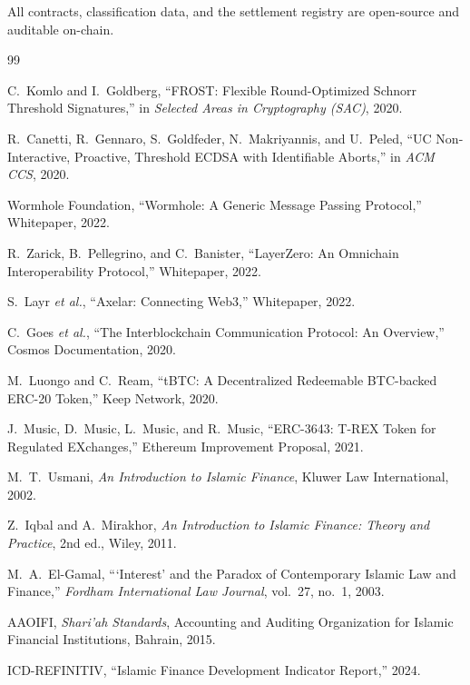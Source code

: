 \documentclass[11pt,twocolumn]{article}
\theoremstyle{definition}
\begin{document}
All contracts, classification data, and the settlement registry are open-source and auditable on-chain.

\begin{thebibliography}{99}

 C.~Komlo and I.~Goldberg, ``FROST: Flexible Round-Optimized Schnorr Threshold Signatures,'' in \emph{Selected Areas in Cryptography (SAC)}, 2020.

 R.~Canetti, R.~Gennaro, S.~Goldfeder, N.~Makriyannis, and U.~Peled, ``UC Non-Interactive, Proactive, Threshold ECDSA with Identifiable Aborts,'' in \emph{ACM CCS}, 2020.

 Wormhole Foundation, ``Wormhole: A Generic Message Passing Protocol,'' Whitepaper, 2022.

 R.~Zarick, B.~Pellegrino, and C.~Banister, ``LayerZero: An Omnichain Interoperability Protocol,'' Whitepaper, 2022.

 S.~Layr \emph{et al.}, ``Axelar: Connecting Web3,'' Whitepaper, 2022.

 C.~Goes \emph{et al.}, ``The Interblockchain Communication Protocol: An Overview,'' Cosmos Documentation, 2020.

 M.~Luongo and C.~Ream, ``tBTC: A Decentralized Redeemable BTC-backed ERC-20 Token,'' Keep Network, 2020.

 J.~Music, D.~Music, L.~Music, and R.~Music, ``ERC-3643: T-REX Token for Regulated EXchanges,'' Ethereum Improvement Proposal, 2021.

 M.~T.~Usmani, \emph{An Introduction to Islamic Finance}, Kluwer Law International, 2002.

 Z.~Iqbal and A.~Mirakhor, \emph{An Introduction to Islamic Finance: Theory and Practice}, 2nd ed., Wiley, 2011.

 M.~A.~El-Gamal, ```Interest' and the Paradox of Contemporary Islamic Law and Finance,'' \emph{Fordham International Law Journal}, vol.~27, no.~1, 2003.

 AAOIFI, \emph{Shari'ah Standards}, Accounting and Auditing Organization for Islamic Financial Institutions, Bahrain, 2015.

 ICD-REFINITIV, ``Islamic Finance Development Indicator Report,'' 2024.


\end{thebibliography}
\end{document}
